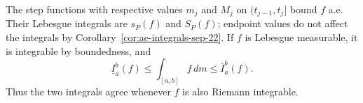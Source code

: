 \begin{remark}
  The step functions with respective values $m_j$ and $M_j$ on
  $(t_{j-1},t_j]$ bound $f$ a.e. Their Lebesgue integrals are
  $s_P(f)$ and $S_P(f)$; endpoint values do not affect the integrals
  by Corollary~\ref{cor:ae-integrals-sep-22}. If $f$ is Lebesgue
  measurable, it is integrable by boundedness, and
  \[
    \underline I_a^b(f)
      \leq\int_{[a,b]}f\,dm
      \leq\overline I_a^b(f).
  \]
  Thus the two integrals agree whenever $f$ is also Riemann integrable.
\end{remark}

\FloatBarrier
